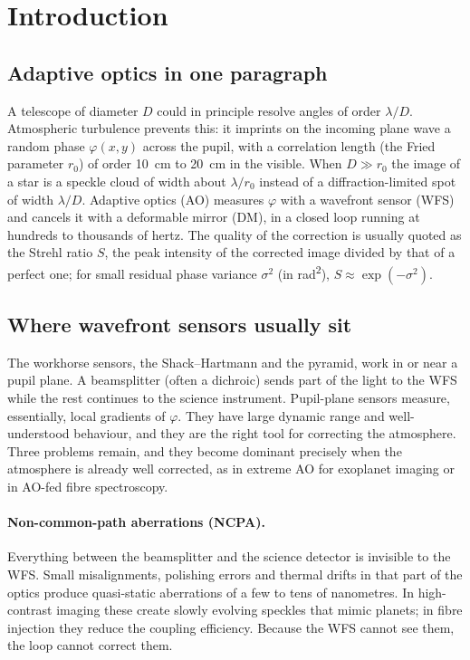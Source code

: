 \documentclass[11pt,a4paper]{article}
\begin{document}
\tableofcontents
\newpage

\section{Introduction}

\subsection{Adaptive optics in one paragraph}
A telescope of diameter $D$ could in principle resolve angles of order $\lambda/D$. Atmospheric turbulence prevents this: it imprints on the incoming plane wave a random phase $\varphi(x,y)$ across the pupil, with a correlation length (the Fried parameter $r_0$) of order \SI{10}{\centi\meter} to \SI{20}{\centi\meter} in the visible. When $D \gg r_0$ the image of a star is a speckle cloud of width about $\lambda/r_0$ instead of a diffraction-limited spot of width $\lambda/D$. Adaptive optics (AO) measures $\varphi$ with a wavefront sensor (WFS) and cancels it with a deformable mirror (DM), in a closed loop running at hundreds to thousands of hertz. The quality of the correction is usually quoted as the Strehl ratio $S$, the peak intensity of the corrected image divided by that of a perfect one; for small residual phase variance $\sigma^2$ (in \si{\radian\squared}), $S \approx \exp(-\sigma^2)$.

\subsection{Where wavefront sensors usually sit}
The workhorse sensors, the Shack--Hartmann and the pyramid, work in or near a pupil plane. A beamsplitter (often a dichroic) sends part of the light to the WFS while the rest continues to the science instrument. Pupil-plane sensors measure, essentially, local gradients of $\varphi$. They have large dynamic range and well-understood behaviour, and they are the right tool for correcting the atmosphere. Three problems remain, and they become dominant precisely when the atmosphere is already well corrected, as in extreme AO for exoplanet imaging or in AO-fed fibre spectroscopy.

\paragraph{Non-common-path aberrations (NCPA).} Everything between the beamsplitter and the science detector is invisible to the WFS. Small misalignments, polishing errors and thermal drifts in that part of the optics produce quasi-static aberrations of a few to tens of nanometres. In high-contrast imaging these create slowly evolving speckles that mimic planets; in fibre injection they reduce the coupling efficiency. Because the WFS cannot see them, the loop cannot correct them.
\end{document}
